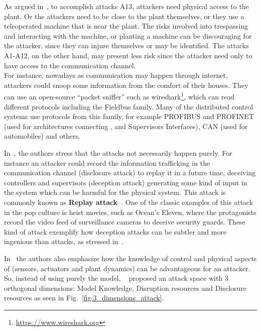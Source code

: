 \documentclass[../main.tex]{subfiles}
\begin{document}
As argued in~\cite{CardenasEtAl2008}, to accomplish attacks A13, attackers need physical access to the plant.
Or the attackers need to be close to the plant themselves, or they use a teleoperated machine that is near the plant.
The risks involved into trespassing and interacting with the machine, or planting a machine can be discouraging for the attacker, since they can injure themselves or may be identified.
The attacks A1-A12, on the other hand, may present less risk since the attacker need only to have access to the communication channel.
\\For instance, nowadays as communication may happen through internet, attackers could snoop some information from the comfort of their houses.
They can use an open-source ``packet sniffer'' such as wireshark\footnote{\url{https://www.wireshark.org}}, which can read different protocols including the Fieldbus family.
Many of the distributed control systems use protocols from this family, for example PROFIBUS and PROFINET (used for \scada{} architectures connecting \plcs{}, \HMIs{} and Supervisors Interfaces), CAN (used for automobiles) and others.

In~\cite{TeixeiraEtAl2015}, the authors stress that the attacks not necessarily happen purely.
For instance an attacker could record the information trafficking in the communication channel (disclosure attack) to replay it in a future time, deceiving controllers and supervisors (deception attack) generating some kind of input in the system which can be harmful for the physical system.
This attack is commonly known as \textbf{Replay attack}~\cite{ZhuMartinez2014}.
One of the classic examples of this attack in the pop culture is heist movies, such as Ocean's Eleven, where the protagonists record the video feed of surveillance cameras to deceive security guards.
These kind of attack exemplify how deception attacks can be subtler and more ingenious than \DoS{} attacks, as stressed in~\cite{MoSinopoli2009}.

In~\cite{TeixeiraEtAl2015} the authors also emphasize how the knowledge of control and physical aspects of \cps{} (sensors, actuators and plant dynamics) can be advantageous for an attacker.
So, instead of using purely the \DDD{} model, \citeauthor{TeixeiraEtAl2015}~\cite{TeixeiraEtAl2015} proposed an attack space with 3 orthogonal dimensions: Model Knowledge, Disruption resources and Disclosure resources as seen in Fig.~\ref{fig:3_dimensions_attack}.
\end{document}
